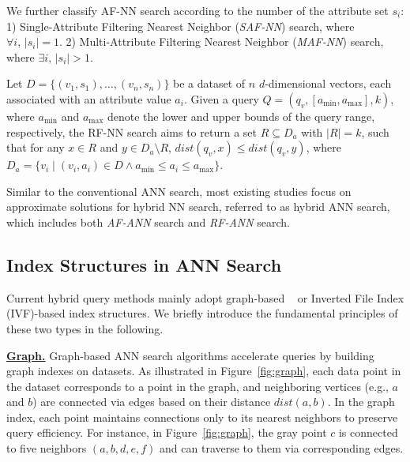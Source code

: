 \documentclass[sigconf, nonacm]{acmart}
\begin{document}
\begin{sloppypar}
We further classify AF-NN search according to the number of the attribute set \( s_i \): 1) Single-Attribute Filtering Nearest Neighbor (\textit{SAF-NN}) search, where $\forall i,\, |s_i| = 1$. 2) Multi-Attribute Filtering Nearest Neighbor (\textit{MAF-NN}) search, where $\exists i,\, |s_i| > 1$.

\begin{definition}[RF-NN Search]

Let \( D = \{(v_1, s_1), \ldots, (v_n, s_n)\} \) be a dataset of \( n \) \( d \)-dimensional vectors, each associated with an attribute value \( a_i \). Given a query \( Q = (q_v, [a_{\min}, a_{\max}], k) \), where \( a_{\min} \) and \( a_{\max} \) denote the lower and upper bounds of the query range, respectively, the RF-NN search aims to return a set \( R \subseteq D_a \) with \( |R| = k \), such that for any \( x \in R \) and \( y \in D_a \setminus R \), \( \textit{dist}(q_v, x) \leq \textit{dist}(q_v, y) \), where \( D_a = \{ v_i \mid (v_i, a_i) \in D \land a_{\min} \leq a_i \leq a_{\max} \} \).
\end{definition}



Similar to the conventional ANN search, most existing studies focus on approximate solutions for hybrid NN search, referred to as hybrid ANN search, which includes both \textit{AF-ANN} search and \textit{RF-ANN} search.



\subsection{Index Structures in ANN Search}

Current hybrid query methods mainly adopt graph-based ~\cite{nsw,kgraph,nsg,fanng,ngt} or Inverted File Index (IVF)-based \cite{PQ} index structures. We briefly introduce the fundamental principles of these two types in the following.

\vspace{1em}
\noindent\textbf{\underline{Graph.}}
Graph-based ANN search algorithms accelerate queries by building graph indexes on datasets. As illustrated in Figure~\ref{fig:graph}, each data point in the dataset corresponds to a point in the graph, and neighboring vertices (e.g., $a$ and $b$) are connected via edges based on their distance $\textit{dist}(a, b)$. In the graph index, each point maintains connections only to its nearest neighbors to preserve query efficiency. For instance, in Figure~\ref{fig:graph}, the gray point $c$ is connected to five neighbors $(a, b, d, e, f)$ and can traverse to them via corresponding edges.


\end{sloppypar}
\end{document}
